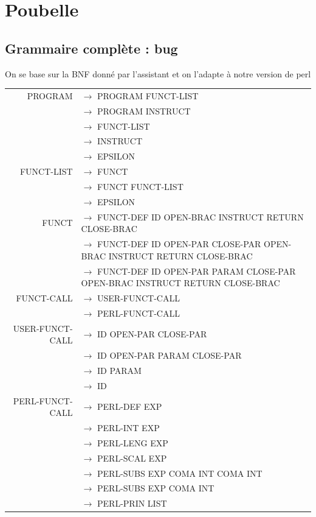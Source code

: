 \documentclass[a4paper,10pt]{article}
\begin{document}
\section{Poubelle}

\subsection{Grammaire complète : bug}

On se base sur la BNF donné par l'assistant et on l'adapte à notre version de perl

\hspace{-4.5cm}\begin{tabular}{rl}
PROGRAM				& $\rightarrow$ PROGRAM FUNCT-LIST\\
					& $\rightarrow$ PROGRAM INSTRUCT\\
					& $\rightarrow$ FUNCT-LIST\\
					& $\rightarrow$ INSTRUCT\\
					& $\rightarrow$ EPSILON\\
					
					
FUNCT-LIST			& $\rightarrow$ FUNCT \\
					& $\rightarrow$ FUNCT FUNCT-LIST\\
					& $\rightarrow$ EPSILON\\
					
FUNCT				& $\rightarrow$ FUNCT-DEF ID OPEN-BRAC INSTRUCT RETURN CLOSE-BRAC \\
					& $\rightarrow$ FUNCT-DEF ID OPEN-PAR CLOSE-PAR OPEN-BRAC INSTRUCT RETURN CLOSE-BRAC \\
					& $\rightarrow$ FUNCT-DEF ID OPEN-PAR PARAM CLOSE-PAR OPEN-BRAC INSTRUCT RETURN CLOSE-BRAC \\

FUNCT-CALL			& $\rightarrow$ USER-FUNCT-CALL \\
					& $\rightarrow$ PERL-FUNCT-CALL \\

USER-FUNCT-CALL		& $\rightarrow$ ID OPEN-PAR CLOSE-PAR\\ 
					& $\rightarrow$ ID OPEN-PAR PARAM CLOSE-PAR\\ 
					& $\rightarrow$ ID PARAM\\ 
					& $\rightarrow$ ID\\ 

				
PERL-FUNCT-CALL		& $\rightarrow$ PERL-DEF EXP \\
					& $\rightarrow$ PERL-INT EXP \\
					& $\rightarrow$ PERL-LENG EXP \\ 
					& $\rightarrow$ PERL-SCAL EXP \\
					& $\rightarrow$ PERL-SUBS EXP COMA INT COMA INT \\
					& $\rightarrow$ PERL-SUBS EXP COMA INT  \\
					& $\rightarrow$ PERL-PRIN LIST \\ 
					

\end{tabular}
\end{document}
